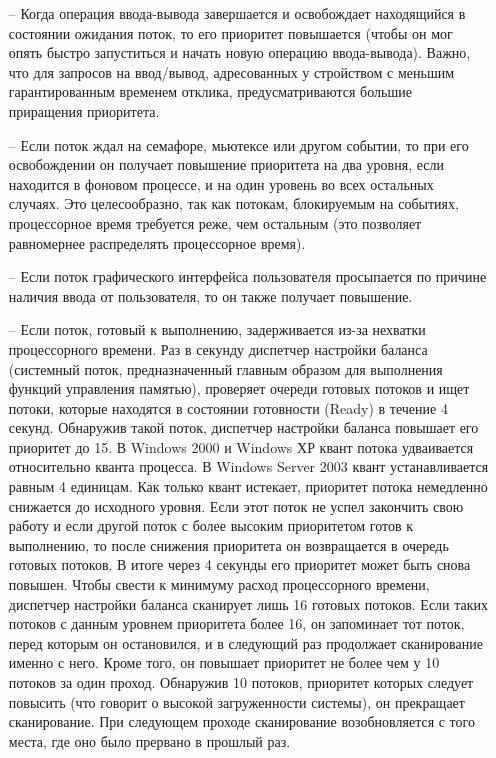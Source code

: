 \begin{itemize}
    \item[--] Когда операция ввода-вывода завершается и освобождает
        находящийся в состоянии ожидания поток, то его приоритет
        повышается (чтобы он мог опять быстро запуститься и начать
        новую операцию ввода-вывода). Важно, что для запросов на
        ввод/вывод, адресованных у стройством с меньшим гарантированным
        временем отклика, предусматриваются большие приращения
        приоритета.
    \item[--] Если поток ждал на семафоре, мьютексе или другом событии,
        то при его освобождении он получает повышение приоритета на
        два уровня, если находится в фоновом процессе, и на один
        уровень во всех остальных случаях. Это целесообразно, так
        как потокам, блокируемым на событиях, процессорное время
        требуется реже, чем остальным (это позволяет равномернее
        распределять процессорное время).
    \item[--]  Если поток графического интерфейса пользователя
        просыпается по причине наличия ввода от пользователя,
        то он также получает повышение.
    \item[--]  Если поток, готовый к выполнению, задерживается из-за
        нехватки процессорного времени. Раз в секунду диспетчер
        настройки баланса (системный поток, предназначенный главным
        образом для выполнения функций управления памятью), проверяет
        очереди готовых потоков и ищет потоки, которые находятся в
        состоянии готовности (Ready) в течение 4 секунд. Обнаружив
        такой поток, диспетчер настройки баланса повышает его приоритет
        до 15. В Windows 2000 и Windows ХР квант потока удваивается
        относительно кванта процесса. В Windows Server 2003 квант
        устанавливается равным 4 единицам. Как только квант истекает,
        приоритет потока немедленно снижается до исходного уровня.
        Если этот поток не успел закончить свою работу и если другой
        поток с более высоким приоритетом готов к выполнению, то после
        снижения приоритета он возвращается в очередь готовых потоков.
        В итоге через 4 секунды его приоритет может быть снова
        повышен. Чтобы свести к минимуму расход процессорного времени,
        диспетчер настройки баланса сканирует лишь 16 готовых потоков.
        Если таких потоков с данным уровнем приоритета более 16, он
        запоминает тот поток, перед которым он остановился, и в
        следующий раз продолжает сканирование именно с него. Кроме
        того, он повышает приоритет не более чем у 10 потоков за
        один проход. Обнаружив 10 потоков, приоритет которых следует
        повысить (что говорит о высокой загруженности системы), он
        прекращает сканирование. При следующем проходе сканирование
        возобновляется с того места, где оно было прервано в
        прошлый раз.
\end{itemize}

